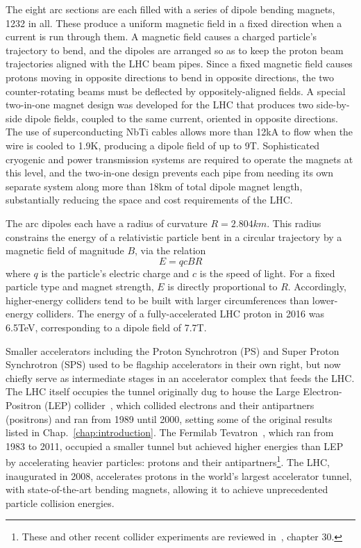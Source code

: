 The eight arc sections are each filled with a series of dipole bending magnets, 1232 in all. These produce a uniform magnetic field in a fixed direction when a current is run through them.
A magnetic field causes a charged particle's trajectory to bend, and the dipoles are arranged so as to keep the proton beam trajectories aligned with the LHC beam pipes.
Since a fixed magnetic field causes protons moving in opposite directions to bend in opposite directions, the two counter-rotating beams must be deflected by oppositely-aligned fields.
A special two-in-one magnet design was developed for the LHC that produces two side-by-side dipole fields, coupled to the same current, oriented in opposite directions. The use of
superconducting NbTi cables allows more than 12\unit{kA} to flow when the wire is cooled to 1.9\unit{K}, producing a dipole field of up to 9\unit{T}. Sophisticated cryogenic and power
transmission systems are required to operate the magnets at this level, and the two-in-one design prevents each pipe from needing its own separate system along more than 18\unit{km} of
total dipole magnet length, substantially reducing the space and cost requirements of the LHC.

The arc dipoles each have a radius of curvature $R = 2.804\unit{km}$. This radius constrains the energy of a relativistic particle
bent in a circular trajectory by a magnetic field of magnitude $B$, via the relation~\cite{ref:WilleAccelerators}
\begin{equation}
E = qcBR
\end{equation}
where $q$ is the particle's electric charge and $c$ is the speed of light. For a fixed
particle type and magnet strength, $E$ is directly proportional to $R$. Accordingly, higher-energy
colliders tend to be built with larger circumferences than lower-energy colliders.
The energy of a fully-accelerated LHC proton in 2016 was 6.5\unit{TeV}, corresponding to a dipole field of 7.7\unit{T}.

Smaller accelerators including the Proton Synchrotron (PS) and Super Proton Synchrotron (SPS) used to be flagship accelerators
in their own right, but now chiefly serve as intermediate stages in an accelerator complex that feeds the LHC.
The LHC itself occupies the tunnel originally dug to house the Large Electron-Positron (LEP) collider~\cite{ref:SchopperLEP}, which collided
electrons and their antipartners (positrons) and ran from 1989 until 2000, setting some of the original results
listed in Chap.~\ref{chap:introduction}. The Fermilab Tevatron~\cite{ref:TevatronPhysics}, which ran from 1983 to 2011, occupied a smaller tunnel
but achieved higher energies than LEP by accelerating heavier particles: protons and their antipartners\footnote{These and other recent collider
experiments are reviewed in~\cite{ref:PDG}, chapter 30.}. The LHC, inaugurated in 2008,
accelerates protons in the world's largest accelerator tunnel, with state-of-the-art bending
magnets, allowing it to achieve unprecedented particle collision energies.


